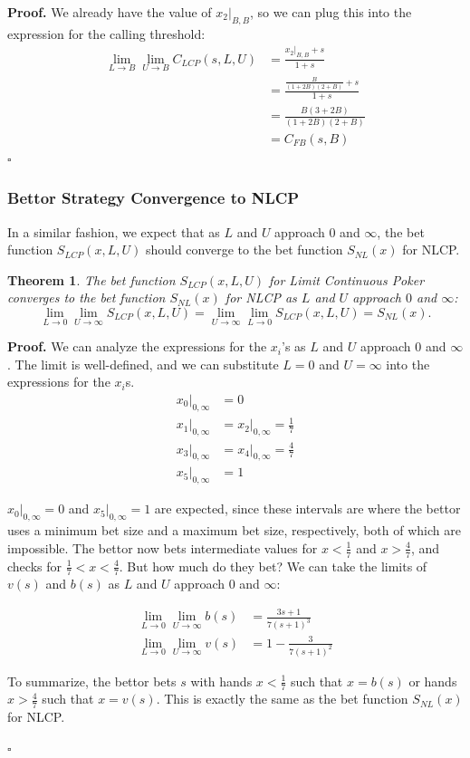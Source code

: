 \documentclass[a4paper,12pt]{article}
\theoremstyle{plain}
\newtheorem{theorem}{Theorem}[section]
\theoremstyle{definition}
\newenvironment{customproof}[1][Proof]{\noindent\textbf{#1.} }{\hfill$\square$\vspace{1em}}
\begin{document}
\begin{customproof}
We already have the value of $x_2|_{B,B}$, so we can plug this into the expression for the calling threshold:
\begin{align*}
    \lim_{L \to B} \lim_{U \to B} C_{LCP}(s, L, U) & = \frac{x_2|_{B,B}+s}{1+s} \\
    & = \frac{\frac{B}{(1+2B)(2+B)} + s}{1+s} \\
    & = \frac{B(3+2B)}{(1+2B)(2+B)} \\
    & = C_{FB}(s, B)
\end{align*}
\end{customproof}

\subsubsection{Bettor Strategy Convergence to NLCP}

In a similar fashion, we expect that as $L$ and $U$ approach $0$ and $\infty$, the bet function $S_{LCP}(x, L, U)$ should converge to the bet function $S_{NL}(x)$ for NLCP.

\begin{theorem}
    The bet function $S_{LCP}(x, L, U)$ for Limit Continuous Poker converges to the bet function $S_{NL}(x)$ for NLCP as $L$ and $U$ approach $0$ and $\infty$:
\[
\lim_{L \to 0} \lim_{U \to \infty} S_{LCP}(x, L, U) = \lim_{U \to \infty} \lim_{L \to 0} S_{LCP}(x, L, U) = S_{NL}(x).
\]
\end{theorem}
\begin{customproof}
We can analyze the expressions for the $x_i$'s as $L$ and $U$ approach $0$ and $\infty$. The limit is well-defined, and we can substitute $L=0$ and $U=\infty$ into the expressions for the $x_i$s.
\begin{align*}
    x_0|_{0,\infty} &= 0 \\
    x_1|_{0,\infty} &= x_2|_{0,\infty} = \frac{1}{7} \\
    x_3|_{0,\infty} &= x_4|_{0,\infty} = \frac{4}{7} \\
    x_5|_{0,\infty} &= 1
\end{align*}

$x_0|_{0,\infty} = 0$ and $x_5|_{0,\infty} = 1$ are expected, since these intervals are where the bettor uses a minimum bet size and a maximum bet size, respectively, both of which are impossible. The bettor now bets intermediate values for $x < \frac{1}{7}$ and $x > \frac{4}{7}$, and checks for $\frac{1}{7} < x < \frac{4}{7}$. But how much do they bet? We can take the limits of $v(s)$ and $b(s)$ as $L$ and $U$ approach $0$ and $\infty$:

\begin{align*}
    \lim_{L \to 0} \lim_{U \to \infty} b(s) &= \frac{3 s+1}{7 (s+1)^3}\\
    \lim_{L \to 0} \lim_{U \to \infty} v(s) &= 1 - \frac{3}{7 (s+1)^2}
\end{align*}

To summarize, the bettor bets $s$ with hands $x < \frac{1}{7}$ such that $x = b(s)$ or hands $x > \frac{4}{7}$ such that $x = v(s)$. This is exactly the same as the bet function $S_{NL}(x)$ for NLCP.

\end{customproof}
\end{document}
